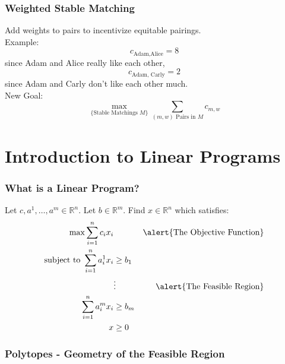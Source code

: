 \documentclass[10pt]{beamer}
\begin{document}
\begin{frame}
\frametitle{Weighted Stable Matching}
Add weights to pairs to incentivize equitable pairings.\\
Example:
$$c_{\text{Adam,Alice}} = 8$$ since Adam and Alice really like each other,
$$c_{\text{Adam, Carly}} = 2$$ since Adam and Carly don't like each other much.\\
New Goal:
$$\max_{\{\text{Stable Matchings $M$}\}} \sum_{\text{$(m,w)$ Pairs in $M$}} c_{m,w}$$
\end{frame}

\section{Introduction to Linear Programs}

\begin{frame}
\frametitle{What is a Linear Program?}
Let $c, a^1, \dots, a^m \in \mathbb{R}^n$. Let $b \in \mathbb{R}^m$. Find $x \in \mathbb{R}^n$ which satisfies:
\begin{align*}
\max \sum_{i=1}^n c_i x_i&\  &\text{\alert{The Objective Function}}\\
\text{subject to } \sum_{i=1}^n a_i^1 x_i &\geq b_1\\
&\vdots &\text{\alert{The Feasible Region}}\\
\sum_{i=1}^n a_i^m x_i &\geq b_m \\
x &\geq 0
\end{align*}
\end{frame}

\begin{frame}
\frametitle{Polytopes - Geometry of the Feasible Region}
\begin{center}
\end{center}
\end{frame}
\end{document}
